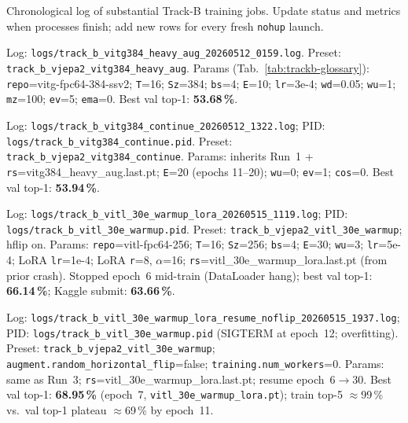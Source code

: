 \begin{table}[ht]
\caption{Chronological log of substantial Track-B training jobs.  Update
status and metrics when processes finish; add new rows for every fresh
\texttt{nohup} launch.}
\label{tab:trackb-runlog}
\begin{minipage}{\linewidth}\small
\begin{description}[leftmargin=1.5em, style=nextline]
\item[\textbf{Run 1} (DONE)]
  Log: \texttt{logs/track\_b\_vitg384\_heavy\_aug\_20260512\_0159.log}.
  Preset: \texttt{track\_b\_vjepa2\_vitg384\_heavy\_aug}.
  Params (Tab.~\ref{tab:trackb-glossary}): \texttt{repo}=vitg-fpc64-384-ssv2;
  \texttt{T}=16; \texttt{Sz}=384; \texttt{bs}=4; \texttt{E}=10; \texttt{lr}=3e-4;
  \texttt{wd}=0.05; \texttt{wu}=1; \texttt{mz}=100; \texttt{ev}=5; \texttt{ema}=0.
  Best val top-1: \textbf{53.68\,\%}.
\item[\textbf{Run 2} (DONE)]
  Log: \texttt{logs/track\_b\_vitg384\_continue\_20260512\_1322.log};
  PID: \texttt{logs/track\_b\_vitg384\_continue.pid}.
  Preset: \texttt{track\_b\_vjepa2\_vitg384\_continue}.
  Params: inherits Run~1 + \texttt{rs}=vitg384\_heavy\_aug.last.pt;
  \texttt{E}=20 (epochs 11--20); \texttt{wu}=0; \texttt{ev}=1; \texttt{cos}=0.
  Best val top-1: \textbf{53.94\,\%}.
\item[\textbf{Run 3} (DONE)]
  Log: \texttt{logs/track\_b\_vitl\_30e\_warmup\_lora\_20260515\_1119.log};
  PID: \texttt{logs/track\_b\_vitl\_30e\_warmup.pid}.
  Preset: \texttt{track\_b\_vjepa2\_vitl\_30e\_warmup}; hflip on.
  Params: \texttt{repo}=vitl-fpc64-256; \texttt{T}=16; \texttt{Sz}=256; \texttt{bs}=4;
  \texttt{E}=30; \texttt{wu}=3; \texttt{lr}=5e-4; LoRA \texttt{lr}=1e-4; LoRA \texttt{r}=8,
  $\alpha$=16; \texttt{rs}=vitl\_30e\_warmup\_lora.last.pt (from prior crash).
  Stopped epoch~6 mid-train (DataLoader hang); best val top-1: \textbf{66.14\,\%};
  Kaggle submit: \textbf{63.66\,\%}.
\item[\textbf{Run 4} (STOPPED)]
  Log: \texttt{logs/track\_b\_vitl\_30e\_warmup\_lora\_resume\_noflip\_20260515\_1937.log};
  PID: \texttt{logs/track\_b\_vitl\_30e\_warmup.pid} (SIGTERM at epoch~12; overfitting).
  Preset: \texttt{track\_b\_vjepa2\_vitl\_30e\_warmup}; \texttt{augment.random\_horizontal\_flip}=false;
  \texttt{training.num\_workers}=0.
  Params: same as Run~3; \texttt{rs}=vitl\_30e\_warmup\_lora.last.pt; resume epoch~6$\to$30.
  Best val top-1: \textbf{68.95\,\%} (epoch~7, \texttt{vitl\_30e\_warmup\_lora.pt});
  train top-5 $\approx$99\,\% vs.\ val top-1 plateau $\approx$69\,\% by epoch~11.

\end{description}
\end{minipage}
\end{table}
